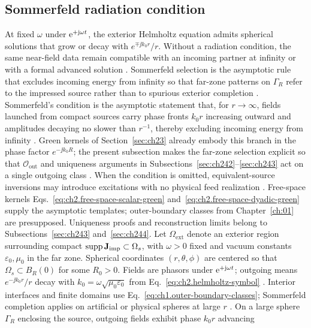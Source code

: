 \subsection{Sommerfeld radiation condition}
\label{sec:ch241}
At fixed $\omega$ under $\mathrm{e}^{+\mathrm{j}\omega t}$, the exterior Helmholtz equation admits spherical solutions that grow or decay with
$e^{\mp\jj k_0 r}/r$. Without a radiation condition, the same near-field data remain compatible with an incoming
partner at infinity or with a formal advanced solution \cite{sommerfeld1949,jackson1999}. Sommerfeld selection is
the asymptotic rule that excludes incoming energy from infinity so that far-zone patterns on $\Gamma_R$ refer to
the impressed source rather than to spurious exterior completion \cite{sommerfeld1949,stratton1941}.
Sommerfeld's condition is the asymptotic statement that, for $r\to\infty$, fields launched from
compact sources carry phase fronts $k_0 r$ increasing outward and amplitudes decaying no slower than
$r^{-1}$, thereby excluding incoming energy from infinity \cite{sommerfeld1949,jackson1999}.
Green kernels of Section~\ref{sec:ch23} already embody this branch in the phase factor
$e^{-\jj k_0 R}$; the present subsection makes the far-zone selection explicit so that
$\mathcal{O}_{\mathrm{out}}$ and uniqueness arguments in Subsections~\ref{sec:ch242}--\ref{sec:ch243}
act on a single outgoing class \cite{stratton1941}.
When the condition is omitted, equivalent-source inversions may introduce excitations with no physical
feed realization \cite{devaney2004}.
Free-space kernels
Eqs.~\eqref{eq:ch2.free-space-scalar-green} and~\eqref{eq:ch2.free-space-dyadic-green}
supply the asymptotic templates; outer-boundary classes from Chapter~\ref{ch:01} are
presupposed. Uniqueness proofs and reconstruction limits belong to
Subsections~\ref{sec:ch243} and~\ref{sec:ch244}.
Let \(\Omega_{\mathrm{ext}}\) denote an exterior region surrounding compact \(\operatorname{supp}\mathbf{J}_{\mathrm{imp}}\subset\Omega_s\), with \(\omega>0\) fixed and vacuum
constants \(\varepsilon_0,\mu_0\) in the far zone. Spherical coordinates
\((r,\theta,\phi)\) are centered so that \(\Omega_s\subset B_R(0)\) for some
\(R_0>0\). Fields are phasors under $\mathrm{e}^{+\mathrm{j}\omega t}$; outgoing means
\(e^{-\jj k_0 r}/r\) decay with \(k_0=\omega\sqrt{\mu_0\varepsilon_0}\) from
Eq.~\eqref{eq:ch2.helmholtz-symbol} \cite{stratton1941}. Interior interfaces and
finite domains use Eq.~\eqref{eq:ch1.outer-boundary-classes}; Sommerfeld completion
applies on artificial or physical spheres at large \(r\) \cite{harrington2001}.
On a large sphere $\Gamma_R$ enclosing the source, outgoing fields exhibit phase $k_0 r$ advancing
